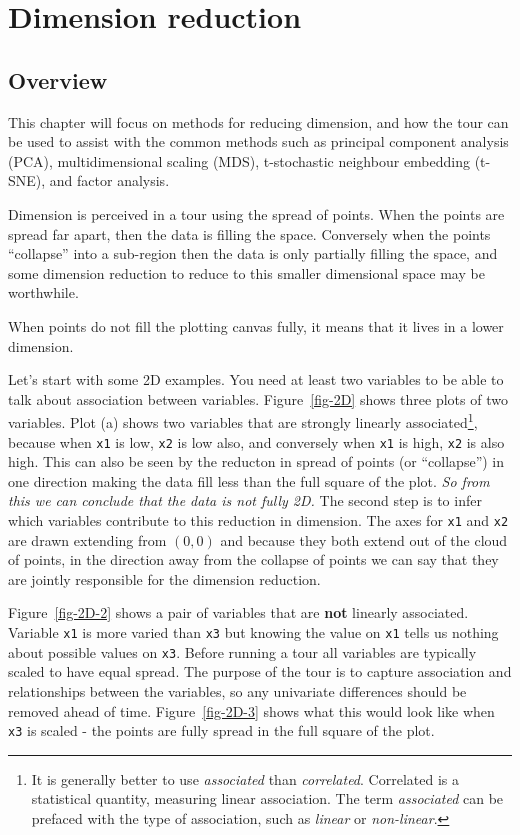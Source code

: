 \documentclass[
  letterpaper,
]{book}
\begin{document}
\part{Dimension reduction}

\hypertarget{sec-dimension-overview}{%
\chapter{Overview}\label{sec-dimension-overview}}

This chapter will focus on methods for reducing dimension, and how the
tour can be used to assist with the common methods such as principal
component analysis (PCA), multidimensional scaling (MDS), t-stochastic
neighbour embedding (t-SNE), and factor analysis.

Dimension is perceived in a tour using the spread of points. When the
points are spread far apart, then the data is filling the space.
Conversely when the points ``collapse'' into a sub-region then the data
is only partially filling the space, and some dimension reduction to
reduce to this smaller dimensional space may be worthwhile.

When points do not fill the plotting canvas fully, it means that it
lives in a lower dimension.

Let's start with some 2D examples. You need at least two variables to be
able to talk about association between variables. Figure~\ref{fig-2D}
shows three plots of two variables. Plot (a) shows two variables that
are strongly linearly associated\footnote{It is generally better to use
  \emph{associated} than \emph{correlated}. Correlated is a statistical
  quantity, measuring linear association. The term \emph{associated} can
  be prefaced with the type of association, such as \emph{linear} or
  \emph{non-linear}.}, because when \texttt{x1} is low, \texttt{x2} is
low also, and conversely when \texttt{x1} is high, \texttt{x2} is also
high. This can also be seen by the reducton in spread of points (or
``collapse'') in one direction making the data fill less than the full
square of the plot. \emph{So from this we can conclude that the data is
not fully 2D.} The second step is to infer which variables contribute to
this reduction in dimension. The axes for \texttt{x1} and \texttt{x2}
are drawn extending from \((0,0)\) and because they both extend out of
the cloud of points, in the direction away from the collapse of points
we can say that they are jointly responsible for the dimension
reduction.

Figure~\ref{fig-2D-2} shows a pair of variables that are \textbf{not}
linearly associated. Variable \texttt{x1} is more varied than
\texttt{x3} but knowing the value on \texttt{x1} tells us nothing about
possible values on \texttt{x3}. Before running a tour all variables are
typically scaled to have equal spread. The purpose of the tour is to
capture association and relationships between the variables, so any
univariate differences should be removed ahead of time.
Figure~\ref{fig-2D-3} shows what this would look like when \texttt{x3}
is scaled - the points are fully spread in the full square of the plot.
\end{document}
